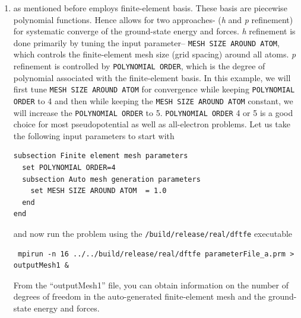 \begin{enumerate}
\item \dftfe{} as mentioned before employs finite-element basis. These basis are piecewise polynomial functions. Hence \dftfe{} allows for two approaches- (\emph{h} and \emph{p} refinement) for systematic converge of the ground-state energy and forces. \emph{h} refinement is done primarily by tuning the input parameter-- \verb|MESH SIZE AROUND ATOM|, which controls the finite-element mesh size (grid spacing) around all atoms. \emph{p} refinement is controlled by \verb|POLYNOMIAL ORDER|, which is the degree of polynomial associated with the finite-element basis. In this example, we will first tune \verb|MESH SIZE AROUND ATOM| for convergence while keeping \verb|POLYNOMIAL ORDER| to 4 and then while keeping the \verb|MESH SIZE AROUND ATOM| constant, we will increase the \verb|POLYNOMIAL ORDER| to 5. \verb|POLYNOMIAL ORDER| 4 or 5 is a good choice for most pseudopotential as well as all-electron problems. Let us take the following input parameters to start with  
\begin{verbatim}	
subsection Finite element mesh parameters
  set POLYNOMIAL ORDER=4
  subsection Auto mesh generation parameters
    set MESH SIZE AROUND ATOM  = 1.0
  end
end
\end{verbatim} 
and now run the problem using the \verb|/build/release/real/dftfe| executable 
\begin{verbatim}
 mpirun -n 16 ../../build/release/real/dftfe parameterFile_a.prm > outputMesh1 &
\end{verbatim}
From the ``outputMesh1'' file, you can obtain information on the number of degrees of freedom in the auto-generated finite-element mesh and the ground-state energy and forces. 


\end{enumerate}
